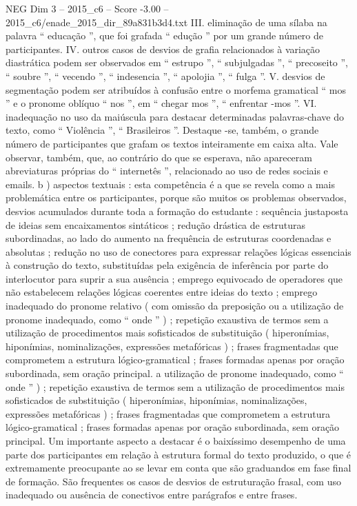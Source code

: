 \begin{textsample}{NEG Dim 3 – 2015\_c6 – Score -3.00 – 2015\_c6/enade\_2015\_dir\_89a831b3d4.txt}
III. eliminação de uma sílaba na palavra “ educação ”, que foi grafada “ edução ” por um grande número de participantes.
IV. outros casos de desvios de grafia relacionados à variação diastrática podem ser observados em “ estrupo ”, “ subjulgadas ”, “ precoseito ”, “ soubre ”, “ vecendo ”, “ indesencia ”, “ apolojia ”, “ fulga ”.
V. desvios de segmentação podem ser atribuídos à confusão entre o morfema gramatical “ mos ” e o pronome oblíquo “ nos ”, em “ chegar mos ”, “ enfrentar -mos ”.
VI. inadequação no uso da maiúscula para destacar determinadas palavras-chave do texto, como “ Violência ”, “ Brasileiros ”.
Destaque -se, também, o grande número de participantes que grafam os textos inteiramente em caixa alta.
Vale observar, também, que, ao contrário do que se esperava, não apareceram abreviaturas próprias do “ internetês ”, relacionado ao uso de redes sociais e emails. b ) aspectos textuais : esta competência é a que se revela como a mais problemática entre os participantes, porque são muitos os problemas observados, desvios acumulados durante toda a formação do estudante : sequência justaposta de ideias sem encaixamentos sintáticos ; redução drástica de estruturas subordinadas, ao lado do aumento na frequência de estruturas coordenadas e absolutas ; redução no uso de conectores para expressar relações lógicas essenciais à construção do texto, substituídas pela exigência de inferência por parte do interlocutor para suprir a sua ausência ; emprego equivocado de operadores que não estabelecem relações lógicas coerentes entre ideias do texto ; emprego inadequado do pronome relativo ( com omissão da preposição ou a utilização de pronome inadequado, como “ onde ” ) ; repetição exaustiva de termos sem a utilização de procedimentos mais sofisticados de substituição ( hiperonímias, hiponímias, nominalizações, expressões metafóricas ) ; frases fragmentadas que comprometem a estrutura lógico-gramatical ; frases formadas apenas por oração subordinada, sem oração principal. a utilização de pronome inadequado, como “ onde ” ) ; repetição exaustiva de termos sem a utilização de procedimentos mais sofisticados de substituição ( hiperonímias, hiponímias, nominalizações, expressões metafóricas ) ; frases fragmentadas que comprometem a estrutura lógico-gramatical ; frases formadas apenas por oração subordinada, sem oração principal.
Um importante aspecto a destacar é o baixíssimo desempenho de uma parte dos participantes em relação à estrutura formal do texto produzido, o que é extremamente preocupante ao se levar em conta que são graduandos em fase final de formação.
São frequentes os casos de desvios de estruturação frasal, com uso inadequado ou ausência de conectivos entre parágrafos e entre frases.

\end{textsample}
